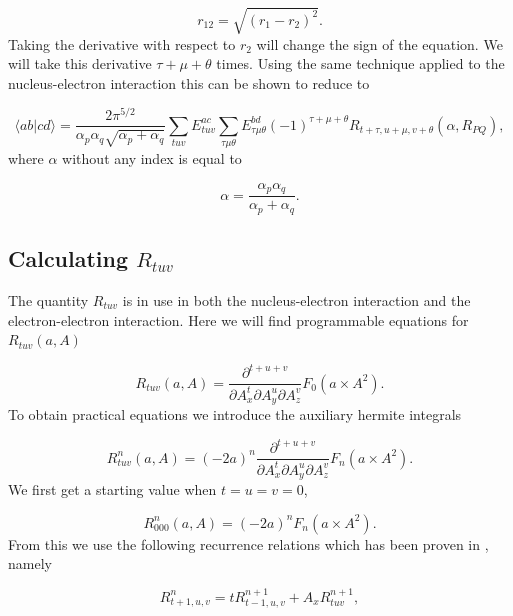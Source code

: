 \documentclass[a4paper,norsk,11pt,twoside]{report}
\begin{document}
\begin{equation}
r_{12} = \sqrt{(r_1 - r_2)^2} .
\end{equation}
Taking the derivative with respect to $r_2$ will change the sign
of the equation. We will take this derivative $\tau + \mu + \theta$
times. Using the same technique applied to the nucleus-electron
interaction this can be shown to reduce to

\begin{equation}
\langle a b | c d \rangle = 
\frac{2 \pi^{5/2}}{\alpha_p \alpha_q \sqrt{\alpha_p + \alpha_q}}
\sum_{tuv} E_{tuv}^{ac} \sum_{\tau \mu \theta} E_{\tau \mu \theta}^{bd} 
\left( -1 \right)^{\tau + \mu + \theta}
R_{t + \tau, u + \mu, v + \theta}(\alpha, R_{PQ}) ,
\label{electron_electron_int_1_1}
\end{equation}
where $\alpha$ without any index is equal to

\begin{equation}
\alpha = \frac{\alpha_p \alpha_q}{\alpha_p + \alpha_q}
. \label{electron_electron_int_1_2}
\end{equation}

\subsection{Calculating $R_{tuv}$}
The quantity $R_{tuv}$ is in use in both the nucleus-electron interaction and the electron-electron interaction. Here we will find programmable equations for $R_{tuv}(a,A)$ 

\begin{equation}
R_{tuv}(a,A) = \frac{\partial^{t+u+v}}{\partial A_x^t \partial A_y^u \partial A_z^v} F_0(a \times A^2) .
\end{equation}
To obtain practical equations  we introduce the auxiliary hermite integrals 

\begin{equation}
R_{tuv}^n (a, A) = (-2a)^n
 \frac{\partial^{t+u+v}}{\partial A_x^t \partial A_y^u \partial A_z^v} F_n(a \times A^2) .
\end{equation}
We first get a starting value when $t = u = v = 0$, 

\begin{equation}
R_{000}^n (a,A) = (-2a)^n F_n(a \times A^2) .
\label{nucelec_0_int}
\end{equation}
From this we use the following recurrence relations which has been proven in \cite{helg2}, namely 

\begin{equation}
R^n_{t+1,u,v} = 
t R^{n+1}_{t-1, u, v} 
+ A_x R^{n+1}_{tuv} ,
\label{nucelec_1_int}
\end{equation}
\end{document}
